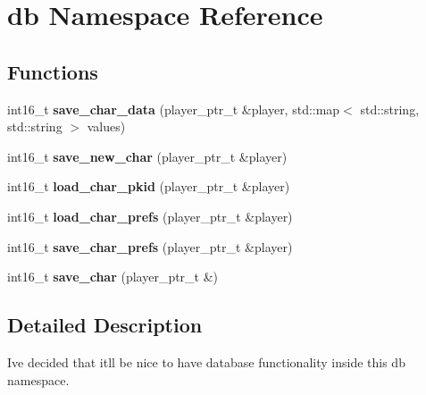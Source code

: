 \hypertarget{namespacedb}{}\section{db Namespace Reference}
\label{namespacedb}
\subsection*{Functions}
\begin{DoxyCompactItemize}
\item 
\mbox{\label{namespacedb_a84a5fa52a98bf52339d88f9a7c3af372}} 
int16\+\_\+t {\bfseries save\+\_\+char\+\_\+data} (player\+\_\+ptr\+\_\+t \&player, std\+::map$<$ std\+::string, std\+::string $>$ values)
\item 
\mbox{\label{namespacedb_aa29179c476dc011d8de366dfc0b788e3}} 
int16\+\_\+t {\bfseries save\+\_\+new\+\_\+char} (player\+\_\+ptr\+\_\+t \&player)
\item 
\mbox{\label{namespacedb_a4056b4cf800b5ba866187949eb162dfe}} 
int16\+\_\+t {\bfseries load\+\_\+char\+\_\+pkid} (player\+\_\+ptr\+\_\+t \&player)
\item 
\mbox{\label{namespacedb_a8e0c6ed844266958b3ace99b43879e5f}} 
int16\+\_\+t {\bfseries load\+\_\+char\+\_\+prefs} (player\+\_\+ptr\+\_\+t \&player)
\item 
\mbox{\label{namespacedb_a829af789d781c07e38376f44439e0aa5}} 
int16\+\_\+t {\bfseries save\+\_\+char\+\_\+prefs} (player\+\_\+ptr\+\_\+t \&player)
\item 
\mbox{\label{namespacedb_a7d4800f5db9263edb085c896c3f9e5a9}} 
int16\+\_\+t {\bfseries save\+\_\+char} (player\+\_\+ptr\+\_\+t \&)
\end{DoxyCompactItemize}


\subsection{Detailed Description}
I\textquotesingle{}ve decided that it\textquotesingle{}ll be nice to have database functionality inside this db namespace. 